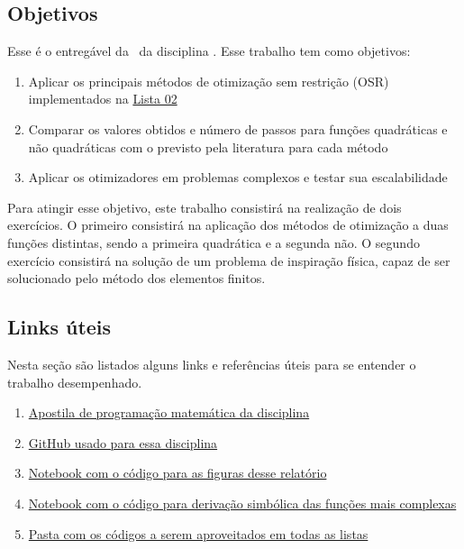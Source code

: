 \documentclass[10pt, a4paper]{article}
\begin{document}
\subsection{Objetivos}

Esse é o entregável da \TITLE \ da disciplina \DISCIPLINE. Esse trabalho tem como objetivos:

\begin{enumerate}
  \item Aplicar os principais métodos de otimização sem restrição (OSR) implementados na \href{https://github.com/prj-phcp/MEC2403_Activities/blob/master/Lista2/Lista2.pdf}{Lista 02}
  \item Comparar os valores obtidos e número de passos para funções quadráticas e não quadráticas com o previsto pela literatura para cada método
  \item Aplicar os otimizadores em problemas complexos e testar sua escalabilidade
\end{enumerate}

Para atingir esse objetivo, este trabalho consistirá na realização de dois exercícios. O primeiro consistirá na aplicação dos
métodos de otimização a duas funções distintas, sendo a primeira quadrática e a segunda não. O segundo exercício consistirá 
na solução de um problema de inspiração física, capaz de ser solucionado pelo método dos elementos finitos.

\subsection{Links úteis}\label{links}

Nesta seção são listados alguns links e referências úteis para se entender o trabalho desempenhado.

\begin{enumerate}
  \item \href{https://web.tecgraf.puc-rio.br/~ivan/MEC2403/ProgMatematica_VazPereiraMenezes-Ago2012.pdf}{Apostila de programação matemática da disciplina}
  \item \href{https://github.com/prj-phcp/MEC2403_Activities}{GitHub usado para essa disciplina}
  \item \href{https://github.com/prj-phcp/MEC2403_Activities/blob/master/Trabalho1/Trabalho1.ipynb}{Notebook com o código para as figuras desse relatório}
  \item \href{https://github.com/prj-phcp/MEC2403_Activities/blob/master/Trabalho1/Derivadas.ipynb}{Notebook com o código para derivação simbólica das funções mais complexas}
  \item \href{https://github.com/prj-phcp/MEC2403_Activities/blob/master/packages}{Pasta com os códigos a serem aproveitados em todas as listas}
\end{enumerate}
\end{document}
